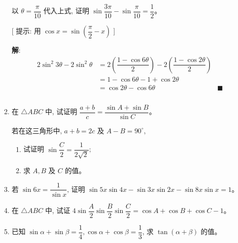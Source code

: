 \documentclass{report}
\newcommand{\sol}{\vspace{0.2cm}\textbf{解}:}
\begin{document}
\begin{enumerate}[leftmargin=*]
    以 $\theta=\dfrac{\pi}{10}$ 代入上式, 证明 $\sin \dfrac{3 \pi}{10}-\sin \dfrac{\pi}{10}=\dfrac{1}{2}$。
    
    [ 提示: 用 $\cos x=\sin \left(\dfrac{\pi}{2}-x\right)$ ]

    \sol{}
    \begin{align*}
        2 \sin ^2 3 \theta-2 \sin ^2 \theta &= 2\left(\dfrac{1 - \cos 6\theta}{2}\right) - 2\left(\dfrac{1 - \cos 2\theta}{2}\right) \\
        & = 1 - \cos 6\theta - 1 + \cos 2\theta \\
        & = \cos 2\theta - \cos 6\theta &\blacksquare\\
        \\
    \end{align*}

    \item 在 $\triangle {ABC}$ 中, 试证明 $\dfrac{a+b}{c}=\dfrac{\sin {A}+\sin {B}}{\sin {C}}$。
    
    若在这三角形中, $a+b=2 c$ 及 ${A}-{B}=90^{\circ}$,
    \begin{enumerate}
        \item 试证明 $\sin \dfrac{C}{2}=\dfrac{1}{2 \sqrt{2}}$;
        \item 求 ${A}, {B}$ 及 ${C}$ 的值。
    \end{enumerate}
    
    \item 若 $\sin 6 x=\dfrac{1}{\sin x}$, 证明 $\sin 5 x \sin 4 x-\sin 3 x \sin 2 x-\sin 8 x \sin x=1$。
    \item 在 $\triangle {ABC}$ 中, 试证 $4 \sin \dfrac{{A}}{2} \sin \dfrac{{B}}{2} \sin \dfrac{{C}}{2}=\cos {A}+\cos {B}+\cos {C}-1$。
    \item 已知 $\sin \alpha+\sin \beta=\dfrac{1}{4}, \cos \alpha+\cos \beta=\dfrac{1}{3}$, 求 $\tan (\alpha+\beta)$ 的值。
    

\end{enumerate}
\end{document}
